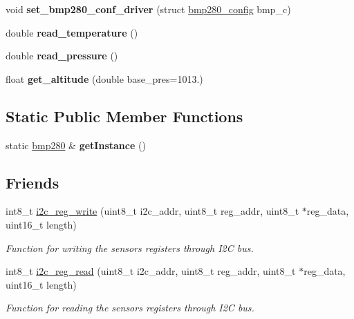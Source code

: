 \begin{DoxyCompactItemize}
\item 
\mbox{\label{classbmp280_ac8426d09704b2d35088d760acb10e876}} 
void {\bfseries set\+\_\+bmp280\+\_\+conf\+\_\+driver} (struct \mbox{\hyperlink{structbmp280__config}{bmp280\+\_\+config}} bmp\+\_\+c)
\item 
\mbox{\label{classbmp280_ae598eb1f714ba9a39896099ee157164f}} 
double {\bfseries read\+\_\+temperature} ()
\item 
\mbox{\label{classbmp280_a9de10ab597caf99df7c2966452721c4d}} 
double {\bfseries read\+\_\+pressure} ()
\item 
\mbox{\label{classbmp280_a0a480dfb132b8efc68f8a9ab00c8d75b}} 
float {\bfseries get\+\_\+altitude} (double base\+\_\+pres=1013.)
\end{DoxyCompactItemize}
\subsection*{Static Public Member Functions}
\begin{DoxyCompactItemize}
\item 
\mbox{\label{classbmp280_a59268d6ba91891061090635edd6fc04b}} 
static \mbox{\hyperlink{classbmp280}{bmp280}} \& {\bfseries get\+Instance} ()
\end{DoxyCompactItemize}
\subsection*{Friends}
\begin{DoxyCompactItemize}
\item 
int8\+\_\+t \mbox{\hyperlink{classbmp280_a6edf190f34f4a642def68cfafd8d3a7f}{i2c\+\_\+reg\+\_\+write}} (uint8\+\_\+t i2c\+\_\+addr, uint8\+\_\+t reg\+\_\+addr, uint8\+\_\+t $\ast$reg\+\_\+data, uint16\+\_\+t length)
\begin{DoxyCompactList}\small\item\em Function for writing the sensor\textquotesingle{}s registers through I2C bus. \end{DoxyCompactList}\item 
int8\+\_\+t \mbox{\hyperlink{classbmp280_a9ea4f460cdfc82cd4c695f0bfd43bdc6}{i2c\+\_\+reg\+\_\+read}} (uint8\+\_\+t i2c\+\_\+addr, uint8\+\_\+t reg\+\_\+addr, uint8\+\_\+t $\ast$reg\+\_\+data, uint16\+\_\+t length)
\begin{DoxyCompactList}\small\item\em Function for reading the sensor\textquotesingle{}s registers through I2C bus. \end{DoxyCompactList}\end{DoxyCompactItemize}


